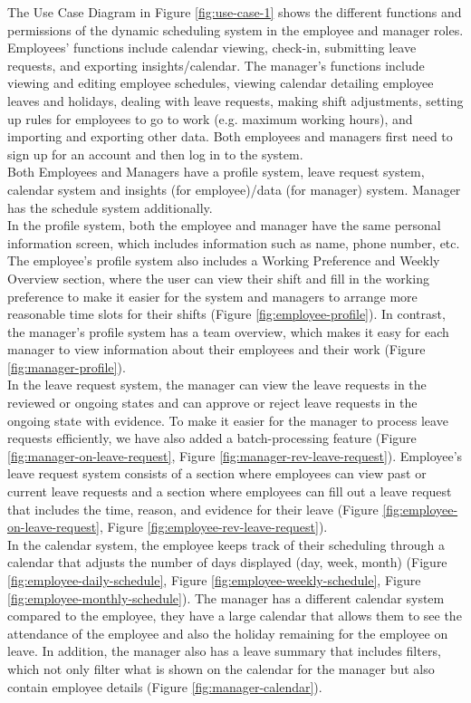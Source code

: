 \documentclass[a4paper,12pt, oneside]{report}
\begin{document}
The Use Case Diagram in Figure \ref{fig:use-case-1} shows the different functions and permissions of the dynamic scheduling system in the employee and manager roles. Employees' functions include calendar viewing, check-in, submitting leave requests,  and exporting insights/calendar. The manager's functions include viewing and editing employee schedules, viewing calendar detailing employee leaves and holidays, dealing with leave requests, making shift adjustments, setting up rules for employees to go to work (e.g. maximum working hours), and importing and exporting other data. Both employees and managers first need to sign up for an account and then log in to the system.\\

Both Employees and Managers have a profile system, leave request system, calendar system and insights (for employee)/data (for manager) system. Manager has the schedule system additionally.\\

In the profile system, both the employee and manager have the same personal information screen, which includes information such as name, phone number, etc. The employee's profile system also includes a Working Preference and Weekly Overview section, where the user can view their shift and fill in the working preference to make it easier for the system and managers to arrange more reasonable time slots for their shifts (Figure \ref{fig:employee-profile}). In contrast, the manager's profile system has a team overview, which makes it easy for each manager to view information about their employees and their work (Figure \ref{fig:manager-profile}).\\

In the leave request system, the manager can view the leave requests in the reviewed or ongoing states and can approve or reject leave requests in the ongoing state with evidence. To make it easier for the manager to process leave requests efficiently, we have also added a batch-processing feature (Figure \ref{fig:manager-on-leave-request}, Figure \ref{fig:manager-rev-leave-request}). Employee's leave request system consists of a section where employees can view past or current leave requests and a section where employees can fill out a leave request that includes the time, reason, and evidence for their leave (Figure \ref{fig:employee-on-leave-request}, Figure \ref{fig:employee-rev-leave-request}). \\

In the calendar system, the employee keeps track of their scheduling through a calendar that adjusts the number of days displayed (day, week, month) (Figure \ref{fig:employee-daily-schedule}, Figure \ref{fig:employee-weekly-schedule}, Figure \ref{fig:employee-monthly-schedule}). The manager has a different calendar system compared to the employee, they have a large calendar that allows them to see the attendance of the employee and also the holiday remaining for the employee on leave. In addition, the manager also has a leave summary that includes filters, which not only filter what is shown on the calendar for the manager but also contain employee details (Figure \ref{fig:manager-calendar}).\\
\end{document}
